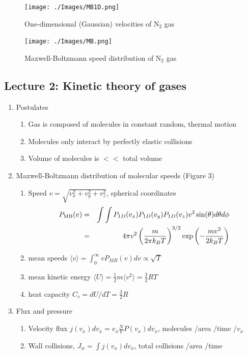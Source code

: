 \documentclass[11pt]{article}
\begin{document}
\begin{figure}[htbp]
\centering
\texttt{[image: ./Images/MB1D.png]}
\caption{One-dimensional (Gaussian) velocities of N\(_2\) gas}
\end{figure}

\begin{figure}[htbp]
\centering
\texttt{[image: ./Images/MB.png]}
\caption{Maxwell-Boltzmann speed distribution of N\(_2\) gas}
\end{figure}

\subsection{Lecture 2: Kinetic theory of gases}
\label{sec:org3aae6f3}
\begin{enumerate}
\item Postulates
\begin{enumerate}
\item Gas is composed of molecules in constant random, thermal motion
\item Molecules only interact by perfectly elastic collisions
\item Volume of molecules is \(<<\) total volume
\end{enumerate}
\item Maxwell-Boltzmann distribution of molecular speeds (Figure 3)
\begin{enumerate}
\item Speed \(v=\sqrt{v_x^2+v_y^2+v_z^2}\), spherical coordinates
 \begin{eqnarray*}   
   P_{\rm MB}(v) & = &\int\int P_{1D}(v_x) P_{1D}(v_y) P_{1D}(v_z) v^2 \sin(\theta) d\theta d\phi \\
     & = &4\pi v^2 \left( \frac{m}{2\pi k_B T}\right)^{3/2}\exp\left(-\frac{m
v^2}{2k_B T}\right)
 \end{eqnarray*}
\item mean speeds \(\langle v \rangle = \int_0^{\infty} v P_{MB}(v)dv \propto \sqrt{T}\)
\item mean kinetic energy \(\langle U \rangle = \frac{1}{2} m \langle v^2 \rangle =\frac{3}{2} RT\)
\item heat capacity \(C_v= dU/dT = \frac{3}{2} R\)
\end{enumerate}
\item Flux and pressure
\begin{enumerate}
\item Velocity flux \(j(v_x) dv_x= v_x \frac{N}{V}P(v_x)dv_x\), molecules /area /time /\(v_x\)
\item Wall collisions, \(J_w = \int j(v_x) dv_x\), total collisions /area /time

\end{enumerate}
\end{enumerate}
\end{document}
